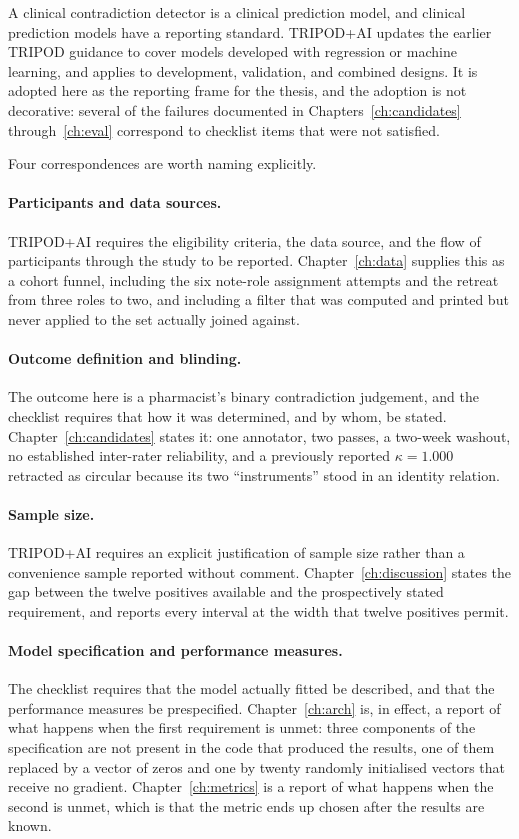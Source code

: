 A clinical contradiction detector is a clinical prediction model, and clinical
prediction models have a reporting standard. TRIPOD+AI
\citep{collins2024tripodai} updates the earlier TRIPOD guidance to cover models
developed with regression or machine learning, and applies to development,
validation, and combined designs. It is adopted here as the reporting frame for
the thesis, and the adoption is not decorative: several of the failures
documented in Chapters~\ref{ch:candidates} through~\ref{ch:eval} correspond to
checklist items that were not satisfied.

Four correspondences are worth naming explicitly.

\paragraph{Participants and data sources.} TRIPOD+AI requires the eligibility
criteria, the data source, and the flow of participants through the study to be
reported. Chapter~\ref{ch:data} supplies this as a cohort funnel, including the
six note-role assignment attempts and the retreat from three roles to two, and
including a filter that was computed and printed but never applied to the set
actually joined against.

\paragraph{Outcome definition and blinding.} The outcome here is a pharmacist's
binary contradiction judgement, and the checklist requires that how it was
determined, and by whom, be stated. Chapter~\ref{ch:candidates} states it: one
annotator, two passes, a two-week washout, no established inter-rater
reliability, and a previously reported $\kappa = 1.000$ retracted as circular
because its two ``instruments'' stood in an identity relation.

\paragraph{Sample size.} TRIPOD+AI requires an explicit justification of sample
size rather than a convenience sample reported without comment.
Chapter~\ref{ch:discussion} states the gap between the twelve positives
available and the prospectively stated requirement, and reports every interval
at the width that twelve positives permit.

\paragraph{Model specification and performance measures.} The checklist requires
that the model actually fitted be described, and that the performance measures
be prespecified. Chapter~\ref{ch:arch} is, in effect, a report of what happens
when the first requirement is unmet: three components of the specification are
not present in the code that produced the results, one of them replaced by a
vector of zeros and one by twenty randomly initialised vectors that receive no
gradient. Chapter~\ref{ch:metrics} is a report of what happens when the second
is unmet, which is that the metric ends up chosen after the results are known.

